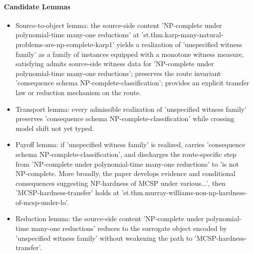 \documentclass[11pt]{article}
\begin{document}
\paragraph{Candidate Lemmas}
\begin{itemize}[leftmargin=*,itemsep=0.2em]
\item Source-to-object lemma: the source-side content 'NP-complete under polynomial-time many-one reductions' at 'st.thm.karp-many-natural-problems-are-np-complete-karp1' yields a realization of 'unspecified witness family' as a family of instances equipped with a monotone witness measure, satisfying admits source-side witness data for 'NP-complete under polynomial-time many-one reductions'; preserves the route invariant 'consequence schema NP-complete-classification'; provides an explicit transfer law or reduction mechanism on the route.
\item Transport lemma: every admissible realization of 'unspecified witness family' preserves 'consequence schema NP-complete-classification' while crossing model shift not yet typed.
\item Payoff lemma: if 'unspecified witness family' is realized, carries 'consequence schema NP-complete-classification', and discharges the route-specific step from 'NP-complete under polynomial-time many-one reductions' to 'is not NP-complete. More broadly, the paper develops evidence and conditional consequences suggesting NP-hardness of MCSP under various...', then 'MCSP-hardness-transfer' holds at 'st.thm.murray-williams-non-np-hardness-of-mcsp-under-lo'.
\item Reduction lemma: the source-side content 'NP-complete under polynomial-time many-one reductions' reduces to the surrogate object encoded by 'unspecified witness family' without weakening the path to 'MCSP-hardness-transfer'.
\end{itemize}
\end{document}
